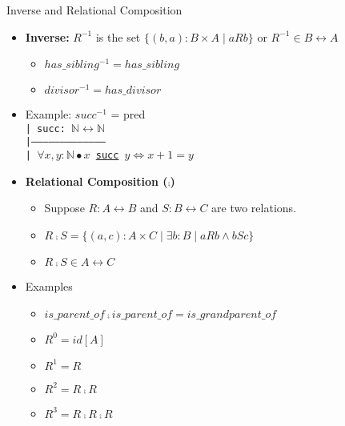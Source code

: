 \documentclass[aspectratio=169]{beamer}
\begin{document}
\begin{frame}{Inverse and Relational Composition}
    \begin{itemize}
        \item \textbf{Inverse:} $R^{-1}$ is the set $\{(b, a) : B \times A \mid a R b \}$ or $R^{-1} \in B \leftrightarrow A$
        \begin{itemize}
            \item $has\_sibling^{-1} = has\_sibling$ 
            \item $divisor^{-1} = has\_divisor$ 
        \end{itemize}
        \item Example: $succ^{-1}$ = pred
        \\ \texttt{| succ: $\mathbb{N} \leftrightarrow \mathbb{N}$
        \\|--------------------------------------
        \\| $\forall x, y : \mathbb{N} \bullet x$ \underline{succ} $y \Leftrightarrow x + 1 = y$ 
        }
        \item \textbf{Relational Composition ($\comp$)}
        \begin{itemize}
            \item Suppose $R: A \leftrightarrow B$ and $S: B \leftrightarrow C$ are two relations.
            \item $R \comp S = \{(a, c) : A \times C \mid \exists b : B \mid a R b \wedge b S c\}$
            \item $R \comp S \in A \leftrightarrow C$
        \end{itemize}
        \item Examples
        \begin{itemize}
            \item $is\_parent\_of \comp is\_parent\_of = is\_grandparent\_of$
            \item $R^{0} = id[A]$
            \item $R^{1} = R$
            \item $R^{2} = R \comp R$
            \item $R^{3} = R \comp R \comp R$
        \end{itemize}
    \end{itemize}
\end{frame}
\end{document}
